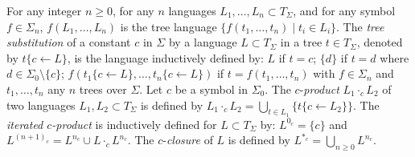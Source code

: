 \documentclass{llncs}
\begin{document}
For any integer $n\geq 0$, for any $n$ languages $L_1, \dots, L_n\subset T_{\Sigma}$, and for any symbol  $f\in \Sigma_n$, $f(L_1, \dots, L_n)$ is the tree language $\lbrace f(t_1, \dots, t_n)\mid t_i\in L_i\rbrace$. The \emph{tree substitution} of a constant $c$ in $\Sigma$ by a language $L\subset T_{\Sigma}$ in a tree $t\in T_{\Sigma}$, denoted by $t\lbrace c \leftarrow L\rbrace$, is the language inductively defined by:
   $L$ if $t=c$; $\lbrace d\rbrace$ if $t=d$ where $d\in \Sigma_0\setminus\{c\}$; $f(t_1\lbrace c \leftarrow L\rbrace, \dots, t_n\lbrace c \leftarrow L\rbrace)$ if $t=f(t_1, \dots, t_n)$ with $f\in\Sigma_n$ and $t_1, \dots, t_n$ any $n$ trees over $\Sigma$.   
    Let $c$ be a symbol in $\Sigma_0$. The $c$-\emph{product} $L_1\cdot_{c} L_2$ of two languages $L_1, L_2\subset T_{\Sigma}$ is  defined by $L_1\cdot_{c} L_2=\bigcup_{t\in L_1}\lbrace t\lbrace c \leftarrow L_2\rbrace \rbrace$. The \emph{iterated $c$-product} is  inductively  defined for $L\subset T_{\Sigma}$ by:  $L^{0_c}=\lbrace c \rbrace$ and $L^{{(n+1)}_c}=L^{n_c}\cup L\cdot_{c} L^{n_c}$. The $c$-\emph{closure} of $L$ is defined by  $L^{*_c}=\bigcup_{n\geq 0} L^{n_c}$.
    
\end{document}
